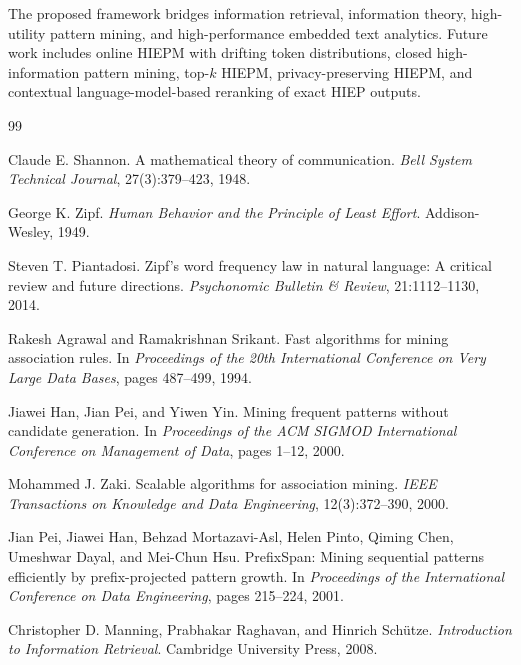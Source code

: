 \documentclass[11pt,a4paper]{article}
\begin{document}
The proposed framework bridges information retrieval, information theory, high-utility pattern mining, and high-performance embedded text analytics. Future work includes online HIEPM with drifting token distributions, closed high-information pattern mining, top-\(k\) HIEPM, privacy-preserving HIEPM, and contextual language-model-based reranking of exact HIEP outputs.



\begin{thebibliography}{99}

Claude E. Shannon.
\newblock A mathematical theory of communication.
\newblock \emph{Bell System Technical Journal}, 27(3):379--423, 1948.

George K. Zipf.
\newblock \emph{Human Behavior and the Principle of Least Effort}.
\newblock Addison-Wesley, 1949.

Steven T. Piantadosi.
\newblock Zipf's word frequency law in natural language: A critical review and future directions.
\newblock \emph{Psychonomic Bulletin \& Review}, 21:1112--1130, 2014.

Rakesh Agrawal and Ramakrishnan Srikant.
\newblock Fast algorithms for mining association rules.
\newblock In \emph{Proceedings of the 20th International Conference on Very Large Data Bases}, pages 487--499, 1994.

Jiawei Han, Jian Pei, and Yiwen Yin.
\newblock Mining frequent patterns without candidate generation.
\newblock In \emph{Proceedings of the ACM SIGMOD International Conference on Management of Data}, pages 1--12, 2000.

Mohammed J. Zaki.
\newblock Scalable algorithms for association mining.
\newblock \emph{IEEE Transactions on Knowledge and Data Engineering}, 12(3):372--390, 2000.

Jian Pei, Jiawei Han, Behzad Mortazavi-Asl, Helen Pinto, Qiming Chen, Umeshwar Dayal, and Mei-Chun Hsu.
\newblock PrefixSpan: Mining sequential patterns efficiently by prefix-projected pattern growth.
\newblock In \emph{Proceedings of the International Conference on Data Engineering}, pages 215--224, 2001.

Christopher D. Manning, Prabhakar Raghavan, and Hinrich Sch{\"u}tze.
\newblock \emph{Introduction to Information Retrieval}.
\newblock Cambridge University Press, 2008.


\end{thebibliography}
\end{document}
